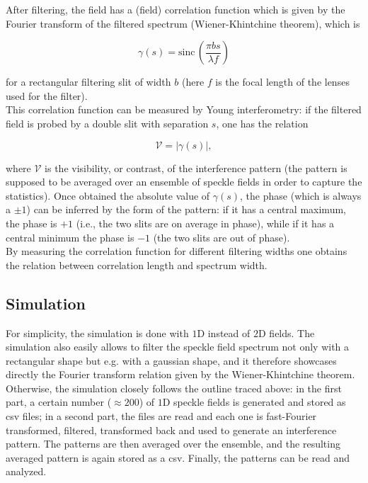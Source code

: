 After filtering, the field has a (field) correlation function which is given by the Fourier transform of the filtered spectrum (Wiener-Khintchine theorem), 
which is

\begin{equation} \label{rect-corr}
    \gamma(s) = \mathrm{sinc}\,\left( \frac{\pi bs}{\lambda f} \right)
\end{equation}

for a rectangular filtering slit of width $b$ (here $f$ is the focal length of the lenses used for the filter). \\

This correlation function can be measured by Young interferometry: if the filtered field is probed by a double slit with separation $s$, one has the relation 

\begin{equation}
    \mathcal V = |\gamma(s)|,
\end{equation}

where $\mathcal V$ is the visibility, or contrast, of the interference pattern (the pattern is supposed to be averaged over an ensemble of speckle fields 
in order to capture the statistics). Once obtained the absolute value of $\gamma(s)$, the phase (which is always a $\pm 1$) can be inferred by the form of the 
pattern: if it has a central maximum, the phase is $+1$ (i.e., the two slits are on average in phase), while if it has a central minimum the phase is $-1$ 
(the two slits are out of phase). \\

By measuring the correlation function for different filtering widths one obtains the relation between correlation length and spectrum width.

\subsection{Simulation}

For simplicity, the simulation is done with $1$D instead of $2$D fields. The simulation also easily allows to filter the speckle field spectrum not only with 
a rectangular shape but e.g. with a gaussian shape, and it therefore showcases directly the Fourier transform relation given by the Wiener-Khintchine theorem. \\

Otherwise, the simulation closely follows the outline traced above: in the first part, a certain number ($\approx 200$) of $1$D speckle fields is generated 
and stored as csv files; in a second part, the  files are read and each one is fast-Fourier transformed, filtered, transformed back and used to generate an 
interference pattern. The patterns are then averaged over the ensemble, and the resulting averaged pattern is again stored as a csv. Finally, the patterns can 
be read and analyzed. \\